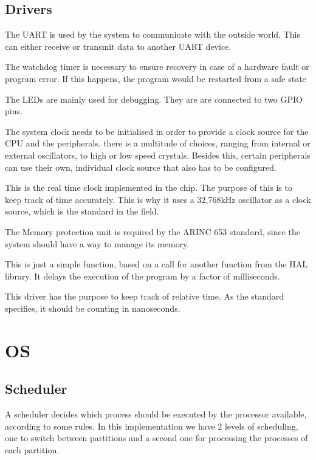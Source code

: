 \subsection{Drivers}
\begin{description}[align=left]
	\item [\textbf{UART driver}] The UART is used by the system to communicate with the outside
	world. This can either receive or transmit data to another UART device.
	\item [\textbf{Watchdog timer driver}] The watchdog timer is necessary to ensure recovery
	in case of a hardware fault or program error. If this happens, the program would be restarted
	from a safe state

	\item [\textbf{LEDs}]The LEDs are mainly used for debugging. They are
	are connected to two GPIO pins.
	\item [\textbf{System Clock}]The system clock needs to be initialised 
	in order to provide a clock source for the CPU and the peripherals.
	there is a multitude of choices, ranging from internal or external
	oscillators, to high or low speed crystals. Besides this, certain
	peripherals can use their own, individual clock source that also has
	to be configured.
	\item [\textbf{RTC}]This is the real time clock implemented in the 
	chip. The purpose of this is to keep track of time accurately. This 
	is why it uses a 32,768kHz oscillator as a clock source, which is 
	the standard in the field.
	\item [\textbf{MPU}]The Memory protection unit is required by the
	ARINC 653 standard, since the system should have a way to manage its
	memory.
	\item [\textbf{Delay}]This is just a simple function, based on a call
	for another function from the HAL library. It delays the execution 
	of the program by a factor of milliseconds.
	\item [\textbf{Timing}]This driver has the purpose to keep track of 
	relative time. As the standard specifies, it should be counting in 
	nanoseconds.

\end{description}

\section{OS}
\subsection{Scheduler}
A scheduler decides which process should be executed by the processor available, according to some rules. In this implementation we have 2 levels of scheduling, one to switch between partitions and a second one for processing the processes of each partition.

